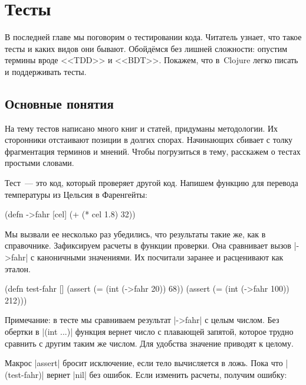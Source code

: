 \chapter{Тесты}

\label{chapter-tests}

\begin{teaser}
В последней главе мы поговорим о тестировании кода. Читатель узнает, что такое
тесты и каких видов они бывают. Обойд\"{е}мся без лишней сложности: опустим
термины вроде <<TDD>> и <<BDT>>. Покажем, что в~Clojure легко писать и
поддерживать тесты.
\end{teaser}

\section{Основные понятия}

На тему тестов написано много книг и статей, придуманы методологии. Их
сторонники отстаивают позиции в долгих спорах. Начинающих сбивает с толку
фрагментация терминов и мнений. Чтобы погрузиться в тему, расскажем о тестах
простыми словами.

Тест~--- это код, который проверяет другой код. Напишем функцию для перевода
температуры из Цельсия в Фаренгейты:

\begin{english}
  \begin{clojure}
(defn ->fahr [cel]
  (+ (* cel 1.8) 32))
  \end{clojure}
\end{english}

Мы вызвали ее несколько раз убедились, что результаты такие же, как в
справочнике. Зафиксируем расчеты в функции проверки. Она сравнивает вызов
\spverb|->fahr| с каноничными значениями. Их посчитали заранее и расценивают как
эталон.

\begin{english}
  \begin{clojure}
(defn test-fahr []
  (assert (= (int (->fahr 20)) 68))
  (assert (= (int (->fahr 100)) 212)))
  \end{clojure}
\end{english}

Примечание: в тесте мы сравниваем результат \spverb|->fahr| с целым числом. Без
обертки в \spverb|(int ...)| функция вернет число с плавающей запятой, которое
трудно сравнить с другим таким же числом. Для удобства значение приводят к
целому.

Макрос \spverb|assert| бросит исключение, если тело вычисляется в ложь. Пока что
\spverb|(test-fahr)| вернет \spverb|nil| без ошибок. Если изменить расчеты,
получим ошибку:

